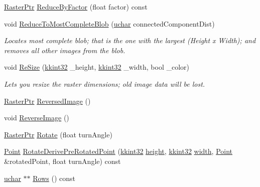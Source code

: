 \begin{DoxyCompactItemize}
\item 
\hyperlink{class_k_k_b_1_1_raster_aefa532857fd6aa9eb53f79da55a97c5a}{Raster\+Ptr} \hyperlink{class_k_k_b_1_1_raster_abd1fcfba95cd98f0509810dc6d1c9784}{Reduce\+By\+Factor} (float factor) const 
\item 
void \hyperlink{class_k_k_b_1_1_raster_a80542e020bcb5252079bea98b7f19e50}{Reduce\+To\+Most\+Complete\+Blob} (\hyperlink{namespace_k_k_b_ace9969169bf514f9ee6185186949cdf7}{uchar} connected\+Component\+Dist)
\begin{DoxyCompactList}\small\item\em Locates most complete blob; that is the one with the largest (Height x Width); and removes all other images from the blob. \end{DoxyCompactList}\item 
void \hyperlink{class_k_k_b_1_1_raster_ad0a4daf2ba175cedf00ce975bb746417}{Re\+Size} (\hyperlink{namespace_k_k_b_a8fa4952cc84fda1de4bec1fbdd8d5b1b}{kkint32} \+\_\+height, \hyperlink{namespace_k_k_b_a8fa4952cc84fda1de4bec1fbdd8d5b1b}{kkint32} \+\_\+width, bool \+\_\+color)
\begin{DoxyCompactList}\small\item\em Lets you resize the raster dimensions; old image data will be lost. \end{DoxyCompactList}\item 
\hyperlink{class_k_k_b_1_1_raster_aefa532857fd6aa9eb53f79da55a97c5a}{Raster\+Ptr} \hyperlink{class_k_k_b_1_1_raster_a7e08c23ca46019cf0d71fbd58816ee50}{Reversed\+Image} ()
\item 
void \hyperlink{class_k_k_b_1_1_raster_a6bd18a014fd3867714e04c037f021497}{Reverse\+Image} ()
\item 
\hyperlink{class_k_k_b_1_1_raster_aefa532857fd6aa9eb53f79da55a97c5a}{Raster\+Ptr} \hyperlink{class_k_k_b_1_1_raster_a7b77d6efde4a3d52b70489180b9afc93}{Rotate} (float turn\+Angle)
\item 
\hyperlink{class_k_k_b_1_1_point}{Point} \hyperlink{class_k_k_b_1_1_raster_a10227c8d743941ea2e8a961fbad3d471}{Rotate\+Derive\+Pre\+Rotated\+Point} (\hyperlink{namespace_k_k_b_a8fa4952cc84fda1de4bec1fbdd8d5b1b}{kkint32} \hyperlink{class_k_k_b_1_1_raster_af39ff189de4fbb6de98392e187efafb7}{height}, \hyperlink{namespace_k_k_b_a8fa4952cc84fda1de4bec1fbdd8d5b1b}{kkint32} \hyperlink{class_k_k_b_1_1_raster_ae0bcc103e191c3421d7692dc69ceb554}{width}, \hyperlink{class_k_k_b_1_1_point}{Point} \&rotated\+Point, float turn\+Angle) const 
\item 
\hyperlink{namespace_k_k_b_ace9969169bf514f9ee6185186949cdf7}{uchar} $\ast$$\ast$ \hyperlink{class_k_k_b_1_1_raster_a2460989f656e5222d6074cd0ba85ed72}{Rows} () const 
$$
\end{DoxyCompactItemize}
